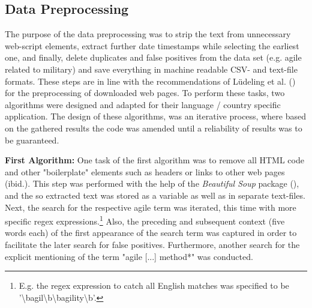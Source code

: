 \subsection{Data Preprocessing}
The purpose of the data  preprocessing was to strip the text from unnecessary web-script elements, extract further date timestamps while selecting the earliest one, and finally, delete duplicates and false positives from the data set (e.g. agile related to military) and save everything in machine readable CSV- and text-file formats. These steps are in line with the recommendations of Lüdeling et al. (\cite*[p. 19]{Ludeling2015}) for the preprocessing of downloaded web pages. To perform these tasks, two algorithms were designed and adapted for their language / country specific application. The design of these algorithms, was an iterative process, where based on the gathered results the code was amended until a reliability of results was to be guaranteed.\par 
\textbf{First Algorithm:} One task of the first algorithm was to remove all HTML code and other "boilerplate" elements such as headers or links to other web pages (ibid.). This step was performed with the help of the \textit{Beautiful Soup} package (\cite{Richardson2007}), and the so extracted text was stored as a variable as well as in separate text-files. Next, the search for the respective agile term was iterated, this time with more specific regex expressions.\footnote{E.g. the regex expression to catch all English matches was specified to be '\textbackslash bagil\textbackslash b\textbar \textbackslash bagility\textbackslash b'.} Also, the preceding and subsequent context (five words each) of the first appearance of the search term was captured in order to facilitate the later search for false positives. Furthermore, another search for the explicit mentioning of the term "agile [...] method*" was conducted.\par 
